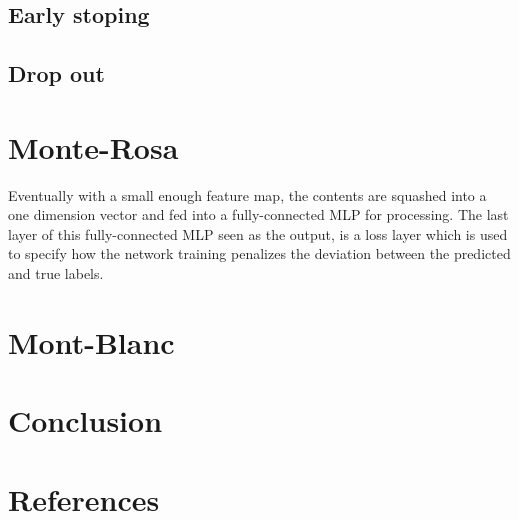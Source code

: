 \documentclass[final, paper=letter,5p,times,twocolumn]{elsarticle}
\begin{document}
\subsection{Early stoping}
\lipsum[21-21]
\subsection{Drop out}
\lipsum[22-22]


\section{Monte-Rosa}

\lipsum[30-33]

Eventually with a small enough feature map, the contents are squashed into a one dimension vector and fed into a fully-connected MLP for processing. The last layer of this fully-connected MLP seen as the output, is a loss layer which is used to specify how the network training penalizes the deviation between the predicted and true labels.


\section{Mont-Blanc}

\lipsum[40-43]

\section{Conclusion}

\lipsum[6-10]

\section*{References}



\end{document}
